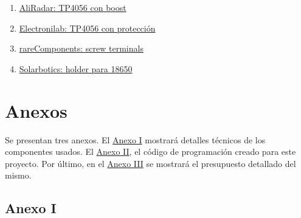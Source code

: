 \documentclass[12pt]{article}
\begin{document}
\begin{enumerate}
				
				\item 
				\label{bib: aliradar tp4056 con boost}
				\href{https://en.aliradar.com/item/4001246163578-lithium-li-ion-18650-3.7v-4.2v-9v-5v-2a-battery-charger-board-adjustable-dc-dc-step-up-boost-module-tp4056}{AliRadar: TP4056 con boost}
				
				
				\item 
				\label{bib: electronilab tp4056 con proteccion}
				\href{https://electronilab.co/tienda/modulo-cargador-bateria-de-lipo-1a-micro-usb-5v/}{Electronilab: TP4056 con protección}
				
				\item 
				\label{bib: rarecomponents screw}
				\href{https://rarecomponents.com/store/1219}{rareComponents: screw terminals}
				
				\item 
				\label{bib: solarbotics holder para 18650}
				\href{https://solarbotics.com/product/600058/}{Solarbotics: holder para 18650}
				
				
				
			\end{enumerate}
		

			

	\pagebreak
	
	\section*{Anexos}
	
	\noindent Se presentan tres anexos. El \hyperref[anexo I: ficha tecnica]{Anexo I} mostrará detalles técnicos de los componentes usados. El \hyperref[anexo II: codigo]{Anexo II}, el código de programación creado para este proyecto. Por último, en el \hyperref[anexo III: presupuesto]{Anexo III} se mostrará el presupuesto detallado del mismo. \\
	
	\pagebreak
	
	\subsection*{Anexo I}
	\label{anexo I: ficha tecnica}
	 \\
	
\end{document}
